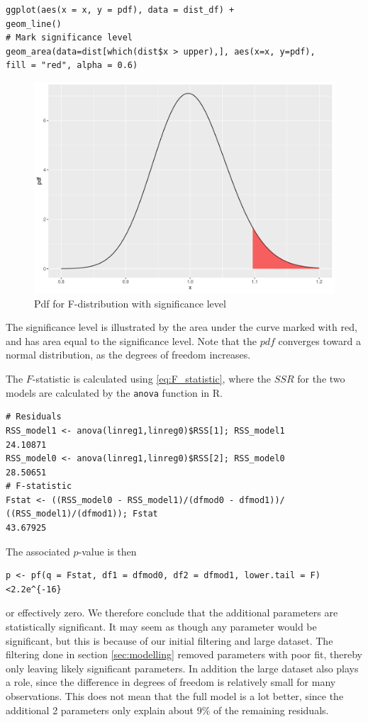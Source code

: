\begin{lstlisting}
ggplot(aes(x = x, y = pdf), data = dist_df) +
geom_line()
# Mark significance level
geom_area(data=dist[which(dist$x > upper),], aes(x=x, y=pdf), 
fill = "red", alpha = 0.6)
\end{lstlisting}
    
\begin{figure}[H]
    \centering
  \includegraphics[width = 0.5 \textwidth]{figures/Fdistsign.pdf}
  \caption{Pdf for F-distribution with significance level}
  \label{fig:my_label}
\end{figure}
    
The significance level is illustrated by the area under the curve marked with red, and has area equal to the significance level.
Note that the $pdf$ converges toward a normal distribution, as the degrees of freedom increases.
    
The $F$-statistic is calculated using \eqref{eq:F_statistic}, where the $SSR$ for the two models are calculated by the \texttt{anova} function in R. 
\begin{lstlisting}
# Residuals
RSS_model1 <- anova(linreg1,linreg0)$RSS[1]; RSS_model1
24.10871
RSS_model0 <- anova(linreg1,linreg0)$RSS[2]; RSS_model0
28.50651
# F-statistic
Fstat <- ((RSS_model0 - RSS_model1)/(dfmod0 - dfmod1))/
((RSS_model1)/(dfmod1)); Fstat
43.67925
\end{lstlisting}
The associated $p$-value is then
\begin{lstlisting}
p <- pf(q = Fstat, df1 = dfmod0, df2 = dfmod1, lower.tail = F)
<2.2e^{-16}
\end{lstlisting}
or effectively zero. We therefore conclude that the additional parameters are statistically significant.
It may seem as though any parameter would be significant, but this is because of our initial filtering and large dataset.
The filtering done in section \ref{sec:modelling} removed parameters with poor fit, thereby only leaving likely significant parameters.
In addition the large dataset also plays a role, since the difference in degrees of freedom is relatively small for many observations. 
This does not mean that the full model is a lot better, since the additional 2 parameters only explain about $9\%$ of the remaining residuals. 

